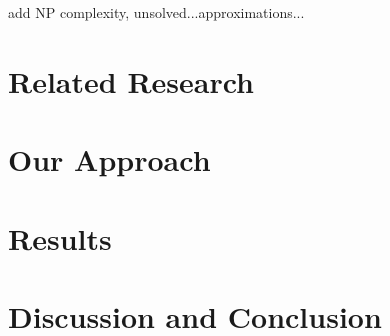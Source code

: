\documentclass{article}
\begin{document}
add NP complexity, unsolved...approximations...
            


\section{Related Research}


\section{Our Approach}


\section{Results}


\section{Discussion and Conclusion}





\end{document}
